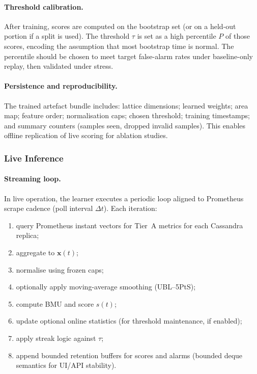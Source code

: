 \documentclass[sigconf]{acmart}
\begin{document}
\paragraph{Threshold calibration.}
After training, scores are computed on the bootstrap set (or on a held-out portion if a split is used). The threshold $\tau$ is set as a high percentile $P$ of those scores, encoding the assumption that most bootstrap time is normal. The percentile should be chosen to meet target false-alarm rates under baseline-only replay, then validated under stress.

\paragraph{Persistence and reproducibility.}
The trained artefact bundle includes: lattice dimensions; learned weights; area map; feature order; normalisation caps; chosen threshold; training timestamps; and summary counters (samples seen, dropped invalid samples). This enables offline replication of live scoring for ablation studies.

%
\subsubsection{Live Inference}
\label{subsubsec:live-inference}

\paragraph{Streaming loop.}
In live operation, the learner executes a periodic loop aligned to Prometheus scrape cadence (poll interval $\Delta t$). Each iteration:
\begin{enumerate}
  \item query Prometheus instant vectors for Tier~A metrics for each Cassandra replica;
  \item aggregate to $\mathbf{x}(t)$;
  \item normalise using frozen caps;
  \item optionally apply moving-average smoothing (UBL--5PtS);
  \item compute BMU and score $s(t)$;
  \item update optional online statistics (for threshold maintenance, if enabled);
  \item apply streak logic against $\tau$;
  \item append bounded retention buffers for scores and alarms (bounded deque semantics for UI/API stability).
\end{enumerate}
\end{document}
